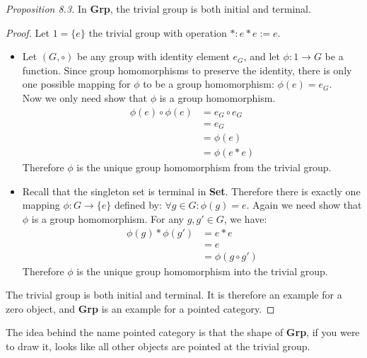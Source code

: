 \textit{Proposition 8.3.} In \textbf{Grp}, the trivial group is both initial and terminal.\begin{proof}

Let $1=\{e\}$ the trivial group with operation $*: e*e := e$.
\begin {itemize}
\item Let $\left({G, \circ}\right)$ be any group with identity element $e_G$,
  and let $\phi: 1 \to G$ be a function.
  Since group homomorphisms to preserve the identity,
  there is only one possible mapping for $\phi$ to be a group homomorphism:
  $\phi (e) = e_G$.\\
  Now we only need show that $\phi$ is a group homomorphism.
  \begin{align*}
    \phi (e) \circ \phi (e) &= e_G \circ e_G \\
                            &= e_G \\
                            &= \phi (e) \\
                            &= \phi (e * e)
  \end{align*}
  Therefore $\phi$ is the unique group homomorphism from the trivial group.
\item Recall that the singleton set is terminal in \textbf{Set}.
  Therefore there is exactly one mapping
  $\phi: G \to \{e\}$ defined by:
  $\forall g \in G: \phi(g) = e$.
  Again we need show that $\phi$ is a group homomorphism.
  For any $g, g' \in G$, we have:
  \begin{align*}
    \phi(g)*\phi(g') &= e * e \\
    &= e \\
    &= \phi (g \circ g')
  \end{align*}
  Therefore $\phi$ is the unique group homomorphism into the trivial group.
\end{itemize}
The trivial group is both initial and terminal. It is therefore an example for a
zero object, and \textbf{Grp} is an example for a pointed category.
\end{proof}
The idea behind the name pointed category is that the shape of \textbf{Grp}, if you were to draw it,
looks like all other objects are pointed at the trivial group.
